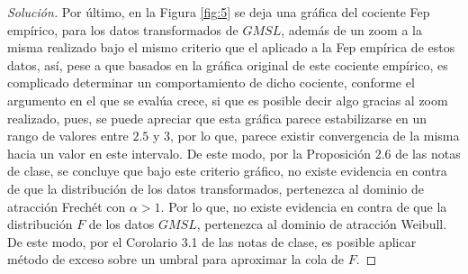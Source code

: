 \documentclass[10.5pt,notitlepage]{article}
\newenvironment{solucion}
  {\begin{proof}[Solución]}
  {\end{proof}}
\theoremstyle{plain}
\begin{document}
\begin{solucion}
Por último, en la Figura \ref{fig:5} se deja una gráfica del cociente Fep empírico, para los datos transformados de \(GMSL\), además de un zoom a la misma realizado bajo el mismo criterio que el aplicado a la Fep empírica de estos datos, así, pese a que basados en la gráfica original de este cociente empírico, es complicado determinar un comportamiento de dicho cociente, conforme el argumento en el que se evalúa crece, si que es posible decir algo gracias al zoom realizado, pues, se puede apreciar que esta gráfica parece estabilizarse en un rango de valores entre \(2.5\) y \(3\), por lo que, parece existir convergencia de la misma hacia un valor en este intervalo. De este modo, por la Proposición 2.6 de las notas de clase, se concluye que bajo este criterio gráfico, no existe evidencia en contra de que la distribución de los datos transformados, pertenezca al dominio de atracción Frechét con \(\alpha >1\). Por lo que, no existe evidencia en contra de que la distribución \(F\) de los datos \(GMSL\), pertenezca al dominio de atracción Weibull. De este modo, por el Corolario 3.1 de las notas de clase, es posible aplicar método de exceso sobre un umbral para aproximar la cola de \(F\).


\end{solucion}
\end{document}
